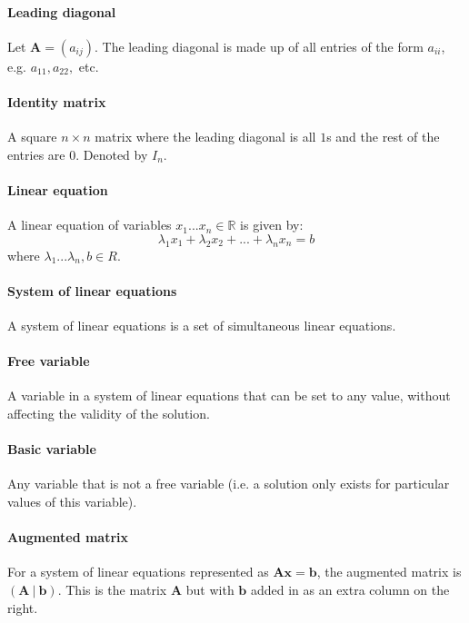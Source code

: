 \documentclass{scrartcl}
\newcommand{\R}{\mathbb{R}}
\renewcommand{\vec}[1]{\mathbf{#1}}
\begin{document}
\paragraph{Leading diagonal}
Let $ \vec{A} = (a_{ij}) $. The leading diagonal is made up of all entries of the form $ a_{ii} $, e.g. $ a_{11}, a_{22}, $ etc.

\paragraph{Identity matrix}
A square $ n \times n $ matrix where the leading diagonal is all $ 1 $s and the rest of the entries are $ 0 $. Denoted by $ I_{n} $.

\paragraph{Linear equation}
A linear equation of variables $ x_{1}...x_{n} \in \R $ is given by:
\begin{equation}
\lambda_{1} x_{1} + \lambda_{2} x_{2} + ... + \lambda_{n} x_{n} = b
\end{equation}
where $ \lambda_{1} ... \lambda_{n}, b \in R $.

\paragraph{System of linear equations}
A system of linear equations is a set of simultaneous linear equations.

\paragraph{Free variable}
A variable in a system of linear equations that can be set to any value, without affecting the validity of the solution.

\paragraph{Basic variable}
Any variable that is not a free variable (i.e. a solution only exists for particular values of this variable).

\paragraph{Augmented matrix}
For a system of linear equations represented as $ \vec{A} \vec{x} = \vec{b} $, the augmented matrix is $ (\vec{A} \ | \ \vec{b}) $. This is the matrix $ \vec{A} $ but with $ \vec{b} $ added in as an extra column on the right.
\end{document}
